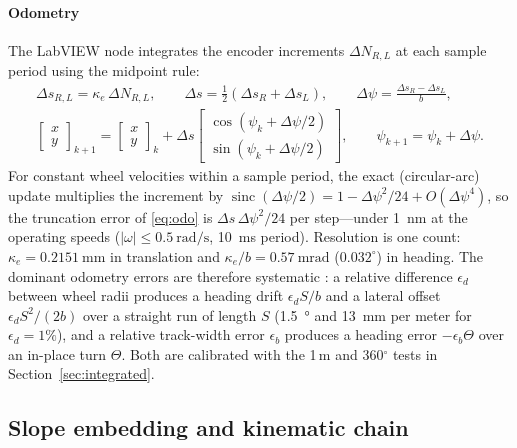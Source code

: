 \paragraph{Odometry}
The LabVIEW node integrates the encoder increments $\Delta N_{R,L}$ at each sample period using the midpoint rule:
\begin{gather}
  \Delta s_{R,L}=\kappa_e\,\Delta N_{R,L},\qquad \Delta s=\tfrac12(\Delta s_R+\Delta s_L),\qquad \Delta\psi=\frac{\Delta s_R-\Delta s_L}{b},\\
  \begin{bmatrix}x\\y\end{bmatrix}_{k+1}=\begin{bmatrix}x\\y\end{bmatrix}_{k}+\Delta s\begin{bmatrix}\cos(\psi_k+\Delta\psi/2)\\ \sin(\psi_k+\Delta\psi/2)\end{bmatrix},\qquad \psi_{k+1}=\psi_k+\Delta\psi .
  \label{eq:odo}
\end{gather}
For constant wheel velocities within a sample period, the exact (circular-arc) update multiplies the increment by $\operatorname{sinc}(\Delta\psi/2)=1-\Delta\psi^2/24+O(\Delta\psi^4)$, so the truncation error of \eqref{eq:odo} is $\Delta s\,\Delta\psi^2/24$ per step---under \SI{1}{\nano\metre} at the operating speeds ($|\omega|\le\SI{0.5}{\radian\per\second}$, \SI{10}{\milli\second} period). Resolution is one count: $\kappa_e=\SI{0.2151}{\milli\metre}$ in translation and $\kappa_e/b=\SI{0.57}{\milli\radian}$ ($0.032^\circ$) in heading. The dominant odometry errors are therefore systematic \cite{borenstein1996}: a relative difference $\epsilon_d$ between wheel radii produces a heading drift $\epsilon_d S/b$ and a lateral offset $\epsilon_d S^2/(2b)$ over a straight run of length $S$ (\SI{1.5}{\degree} and \SI{13}{\milli\metre} per meter for $\epsilon_d=1\%$), and a relative track-width error $\epsilon_b$ produces a heading error $-\epsilon_b\Theta$ over an in-place turn $\Theta$. Both are calibrated with the 1\,m and 360$^\circ$ tests in Section~\ref{sec:integrated}.

\subsection{Slope embedding and kinematic chain}
\label{sec:chain}

